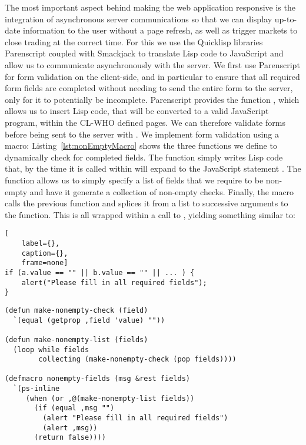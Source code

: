 The most important aspect behind making the web application responsive is the
integration of asynchronous server communications so that we can display
up-to-date information to the user without a page refresh, as well as trigger
markets to close trading at the correct time. For this we use the Quicklisp
libraries Parenscript coupled with Smackjack to translate Lisp code to
JavaScript and allow us to communicate asynchronously with the server. We first
use Parenscript for form validation on the client-side, and in particular to
ensure that all required form fields are completed without needing to send the
entire form to the server, only for it to potentially be incomplete.
Parenscript provides the function , which allows us to insert
Lisp code, that will be converted to a valid JavaScript program, within the
CL-WHO defined pages. We can therefore validate forms before being sent to the
server with . We implement form validation using a macro:
Listing~\ref{lst:nonEmptyMacro} shows the three functions we define to
dynamically check for completed fields. The function 
simply writes Lisp code that, by the time it is called within 
will expand to the JavaScript statement . The function
 allows us to simply specify a list of fields that we
require to be non-empty and have it generate a collection of non-empty checks.
Finally, the macro  calls the previous function and
splices it from a list to successive arguments to the  function. This
is all wrapped within a call to , yielding something similar
to:

\begin{lstlisting}[
	label={},
	caption={},
	frame=none]
if (a.value == "" || b.value == "" || ... ) {
    alert("Please fill in all required fields");
}
\end{lstlisting}

\begin{lstlisting}[float,
	label={lst:nonEmptyMacro},
	caption={Macro for ensuring all required fields are complete}]
(defun make-nonempty-check (field)
  `(equal (getprop ,field 'value) ""))

(defun make-nonempty-list (fields)
  (loop while fields
        collecting (make-nonempty-check (pop fields))))

(defmacro nonempty-fields (msg &rest fields)
  `(ps-inline
     (when (or ,@(make-nonempty-list fields))
       (if (equal ,msg "")
         (alert "Please fill in all required fields")
         (alert ,msg))
       (return false))))
\end{lstlisting}

